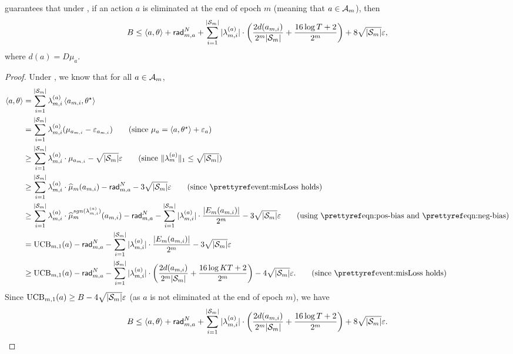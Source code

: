 \begin{lemma}\label{lem:epoch_B_with_mis-reward}
     guarantees that under , if an action $a$ is eliminated at the end of epoch $m$ (meaning that $a\in {\mathcal{A}}_m$), then
    \begin{align*}
    B\leq \left\langle {a,\theta} \right\rangle +\mathsf{rad}_{m,a}^{N}+ \sum_{i=1}^{|{\mathcal{S}}_m|}|\lambda_{m,i}^{(a)}|\cdot\left(\frac{2d(a_{m,i})}{2^m|{\mathcal{S}}_m|}+\frac{16\log T +2}{2^m}\right) + 8\sqrt{|{\mathcal{S}}_m|}\varepsilon,
\end{align*}
where $d(a)=D\mu_a$.
\end{lemma}
\begin{proof}
Under , we know that for all $a\in {\mathcal{A}}_m$,
\begin{align*}
    \inner{a,\theta} &= \sum_{i=1}^{|\calS_m|}\lambda_{m,i}^{(a)}\inner{a_{m,i},\theta^\star} \\
    &= \sum_{i=1}^{|\calS_m|}\lambda_{m,i}^{(a)}(\mu_{a_{m,i}}-\epsilon_{a_{m,i}}) \tag{since $\mu_a = \inner{a,\theta^\star}+\epsilon_a$}\\
    &\geq \sum_{i=1}^{|\calS_m|}\lambda_{m,i}^{(a)}\cdot \mu_{a_{m,i}} - \sqrt{|\calS_m|}\epsilon \tag{since $\|\lambda_{m}^{(a)}\|_1\leq \sqrt{|\calS_m|}$} \\
    &\geq \sum_{i=1}^{|\calS_m|}\lambda_{m,i}^{(a)}\cdot \hat{\mu}_{m}(a_{m,i}) - \rad_{m,a}^{N} - 3\sqrt{|\calS_m|}\epsilon \tag{since \pref{event:misLoss} holds}\\
    &\geq \sum_{i=1}^{|\calS_m|}\lambda_{m,i}^{(a)}\cdot\hat{\mu}_{m}^{sgn(\lambda_{m,i}^{(a)})}(a_{m,i}) - \rad_{m,a}^{N} -\sum_{i=1}^{|\calS_m|}|\lambda_{m,i}^{(a)}|\cdot \frac{|\unobs_m(a_{m,i})|}{2^m} - 3\sqrt{|\calS_m|}\epsilon \tag{using \pref{eqn:pos-bias} and \pref{eqn:neg-bias}}\\
    &= \UCB_{m,1}(a) - \rad_{m,a}^{N} -\sum_{i=1}^{|\calS_m|}|\lambda_{m,i}^{(a)}|\cdot \frac{|\unobs_m(a_{m,i})|}{2^m} - 3\sqrt{|\calS_m|}\epsilon\\
    &\geq \UCB_{m,1}(a) - \rad_{m,a}^{N} - \sum_{i=1}^{|\calS_m|}|\lambda_{m,i}^{(a)}|\cdot\left(\frac{2d(a_{m,i})}{2^m|\calS_m|}+\frac{16\log KT +2}{2^m}\right) - 4\sqrt{|\calS_m|}\epsilon. \tag{since \pref{event:misLoss} holds}
\end{align*}
Since ${\operatorname{UCB}}_{m,1}(a)\geq B - 4\sqrt{|{\mathcal{S}}_m|}\varepsilon$ (as $a$ is not eliminated at the end of epoch $m$), we have
\begin{align*}
    B\leq \left\langle {a,\theta} \right\rangle +\mathsf{rad}_{m,a}^{N}+ \sum_{i=1}^{|{\mathcal{S}}_m|}|\lambda_{m,i}^{(a)}|\cdot\left(\frac{2d(a_{m,i})}{2^m|{\mathcal{S}}_m|}+\frac{16\log T +2}{2^m}\right) + 8\sqrt{|{\mathcal{S}}_m|}\varepsilon.
\end{align*}
\end{proof}

